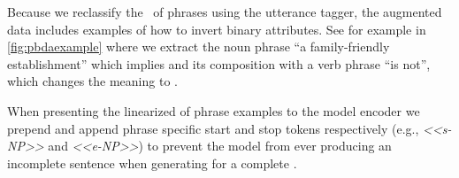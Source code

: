 Because 
we reclassify the \meaningrepresentation~of phrases using the utterance tagger,
the augmented  data includes examples of
how to invert binary attributes.
See for example in \autoref{fig:pbdaexample} where we extract the noun phrase ``a family-friendly establishment'' which implies  and its composition with a verb phrase ``is not'', which changes the meaning to .

When presenting the linearized \meaningrepresentation of phrase examples to 
the model encoder
we prepend and append phrase specific start and stop tokens respectively
(e.g., \textit{<<s-NP>>} and \textit{<<e-NP>>}) to prevent the model
from ever producing an incomplete sentence when generating for a complete 
\meaningrepresentation.



